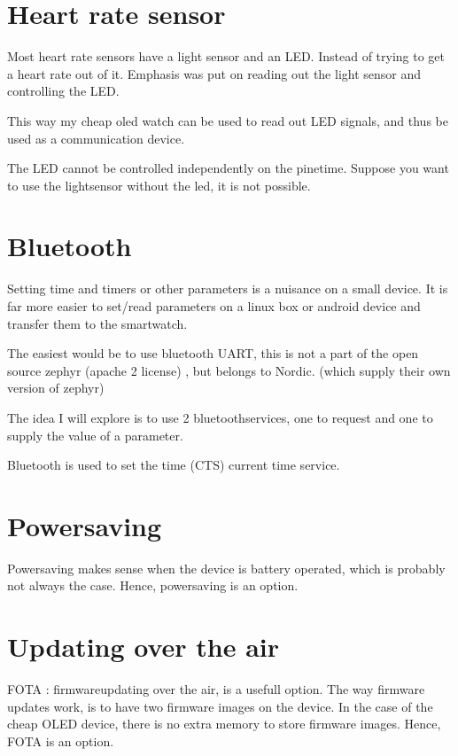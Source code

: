 \documentclass[letterpaper,10pt,english]{sphinxmanual}
\begin{document}
\section{Heart rate sensor}
\label{\detokenize{idea:heart-rate-sensor}}
Most heart rate sensors have a light sensor and an LED.
Instead of trying to get a heart rate out of it.
Emphasis was put on reading out the light sensor and controlling the LED.

This way my cheap oled watch can be used to read out LED signals, and thus be used as a communication device.

The LED cannot be controlled independently on the pinetime. Suppose you want to use the lightsensor without the led, it is not possible.


\section{Bluetooth}
\label{\detokenize{idea:bluetooth}}
Setting time and timers or other parameters is a nuisance on a small device. It is far more easier to set/read parameters on a linux box or android device and transfer them to the smartwatch.

The easiest would be to use bluetooth UART, this is not a part of the open source zephyr (apache 2 license) , but belongs to Nordic. (which supply their own version of zephyr)

The idea I will explore is to use 2 bluetoothservices, one to request and one to supply the value of a parameter.

Bluetooth is used to set the time (CTS) current time service.


\section{Powersaving}
\label{\detokenize{idea:powersaving}}
Powersaving makes sense when the device is battery operated, which is probably not always the case.
Hence, powersaving is an option.


\section{Updating over the air}
\label{\detokenize{idea:updating-over-the-air}}
FOTA : firmwareupdating over the air, is a usefull option.
The way firmware updates work, is to have two firmware images on the device.
In the case of the cheap OLED device, there is no extra memory to store firmware images.
Hence, FOTA is an option.
\end{document}

